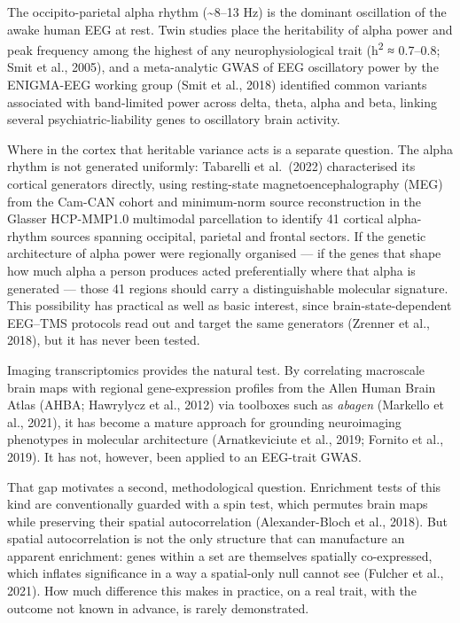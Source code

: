\documentclass[
  11pt,
  letterpaper,
]{article}
\begin{document}
The occipito-parietal alpha rhythm (\textasciitilde8--13 Hz) is the
dominant oscillation of the awake human EEG at rest. Twin studies place
the heritability of alpha power and peak frequency among the highest of
any neurophysiological trait (h\textsuperscript{2} ≈ 0.7--0.8; Smit et
al., 2005), and a meta-analytic GWAS of EEG oscillatory power by the
ENIGMA-EEG working group (Smit et al., 2018) identified common variants
associated with band-limited power across delta, theta, alpha and beta,
linking several psychiatric-liability genes to oscillatory brain
activity.

Where in the cortex that heritable variance acts is a separate question.
The alpha rhythm is not generated uniformly: Tabarelli et al.~(2022)
characterised its cortical generators directly, using resting-state
magnetoencephalography (MEG) from the Cam-CAN cohort and minimum-norm
source reconstruction in the Glasser HCP-MMP1.0 multimodal parcellation
to identify 41 cortical alpha-rhythm sources spanning occipital,
parietal and frontal sectors. If the genetic architecture of alpha power
were regionally organised --- if the genes that shape how much alpha a
person produces acted preferentially where that alpha is generated ---
those 41 regions should carry a distinguishable molecular signature.
This possibility has practical as well as basic interest, since
brain-state-dependent EEG--TMS protocols read out and target the same
generators (Zrenner et al., 2018), but it has never been tested.

Imaging transcriptomics provides the natural test. By correlating
macroscale brain maps with regional gene-expression profiles from the
Allen Human Brain Atlas (AHBA; Hawrylycz et al., 2012) via toolboxes
such as \emph{abagen} (Markello et al., 2021), it has become a mature
approach for grounding neuroimaging phenotypes in molecular architecture
(Arnatkeviciute et al., 2019; Fornito et al., 2019). It has not,
however, been applied to an EEG-trait GWAS.

That gap motivates a second, methodological question. Enrichment tests
of this kind are conventionally guarded with a spin test, which permutes
brain maps while preserving their spatial autocorrelation
(Alexander-Bloch et al., 2018). But spatial autocorrelation is not the
only structure that can manufacture an apparent enrichment: genes within
a set are themselves spatially co-expressed, which inflates significance
in a way a spatial-only null cannot see (Fulcher et al., 2021). How much
difference this makes in practice, on a real trait, with the outcome not
known in advance, is rarely demonstrated.
\end{document}
